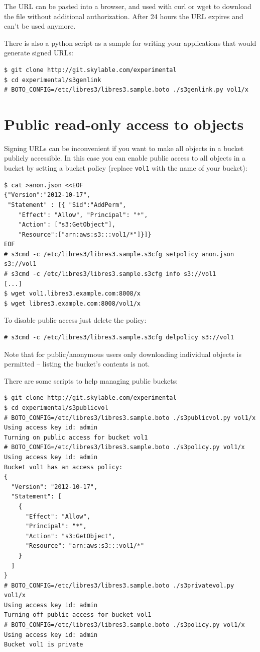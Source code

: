 The URL can be pasted into a browser, and used with curl or wget to download the file without additional authorization. After 24 hours the URL expires and can't be used anymore.

There is also a python script as a sample for writing your applications that
would generate signed URLs:
\begin{lstlisting}
$ git clone http://git.skylable.com/experimental
$ cd experimental/s3genlink
# BOTO_CONFIG=/etc/libres3/libres3.sample.boto ./s3genlink.py vol1/x
\end{lstlisting}

\section*{Public read-only access to objects}

Signing URLs can be inconvenient if you want to make all objects in a bucket
publicly accessible.
In this case you can enable public access to all objects in a bucket by setting
a bucket policy (replace \verb|vol1| with the name of your bucket):
\begin{lstlisting}
$ cat >anon.json <<EOF
{"Version":"2012-10-17",
 "Statement" : [{ "Sid":"AddPerm",
    "Effect": "Allow", "Principal": "*",
    "Action": ["s3:GetObject"],
    "Resource":["arn:aws:s3:::vol1/*"]}]}
EOF
# s3cmd -c /etc/libres3/libres3.sample.s3cfg setpolicy anon.json s3://vol1
# s3cmd -c /etc/libres3/libres3.sample.s3cfg info s3://vol1
[...]
$ wget vol1.libres3.example.com:8008/x
$ wget libres3.example.com:8008/vol1/x
\end{lstlisting}

To disable public access just delete the policy:

\begin{lstlisting}
# s3cmd -c /etc/libres3/libres3.sample.s3cfg delpolicy s3://vol1
\end{lstlisting}

Note that for public/anonymous users only downloading individual objects is
permitted -- listing the bucket's contents is not.

There are some scripts to help managing public buckets:
\begin{lstlisting}
$ git clone http://git.skylable.com/experimental
$ cd experimental/s3publicvol
# BOTO_CONFIG=/etc/libres3/libres3.sample.boto ./s3publicvol.py vol1/x
Using access key id: admin
Turning on public access for bucket vol1
# BOTO_CONFIG=/etc/libres3/libres3.sample.boto ./s3policy.py vol1/x
Using access key id: admin
Bucket vol1 has an access policy:
{
  "Version": "2012-10-17",
  "Statement": [
    {
      "Effect": "Allow",
      "Principal": "*",
      "Action": "s3:GetObject",
      "Resource": "arn:aws:s3:::vol1/*"
    }
  ]
}
# BOTO_CONFIG=/etc/libres3/libres3.sample.boto ./s3privatevol.py vol1/x
Using access key id: admin
Turning off public access for bucket vol1
# BOTO_CONFIG=/etc/libres3/libres3.sample.boto ./s3policy.py vol1/x
Using access key id: admin
Bucket vol1 is private
\end{lstlisting}

